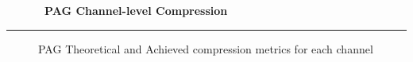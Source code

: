 \cleardoublepage
\begin{figure*}[h!]
  \centering
  \hfill
  {\Huge {\bf \quarter\ PAG Channel-level Compression}}
  \hfill
\end{figure*}
\hrule
\begin{figure*}[h!]
  \centering
  \caption{PAG Theoretical and Achieved compression metrics for each channel}
\end{figure*}

